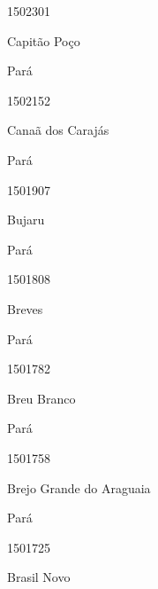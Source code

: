 \documentclass[
  letterpaper,
]{report}
\begin{document}
\n      

1502301

\n      

Capitão Poço

\n    

\n    

\n      

Pará

\n      

1502152

\n      

Canaã dos Carajás

\n    

\n    

\n      

Pará

\n      

1501907

\n      

Bujaru

\n    

\n    

\n      

Pará

\n      

1501808

\n      

Breves

\n    

\n    

\n      

Pará

\n      

1501782

\n      

Breu Branco

\n    

\n    

\n      

Pará

\n      

1501758

\n      

Brejo Grande do Araguaia

\n    

\n    

\n      

Pará

\n      

1501725

\n      

Brasil Novo

\n    
\end{document}
